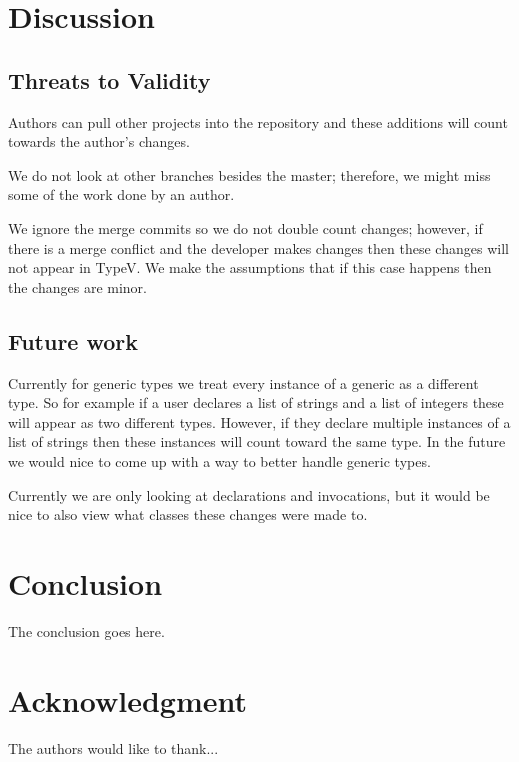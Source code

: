 \documentclass[conference]{IEEEtran}
\begin{document}
\section{Discussion}

\subsection{Threats to Validity}

Authors can pull other projects into the repository and these additions will count towards the author's changes. 

We do not look at other branches besides the master; therefore, we might miss some of the work done by an author.

We ignore the merge commits so we do not double count changes; however, if there is a merge conflict and the developer makes changes then these changes will not appear in TypeV. We make the assumptions that if this case happens then the changes are minor.

\subsection{Future work}

Currently for generic types we treat every instance of a generic as a different type. So for example if a user declares a list of strings and a list of integers these will appear as two different types. However, if they declare multiple instances of a list of strings then these instances will count toward the same type. In the future we would nice to come up with a way to better handle generic types.

Currently we are only looking at declarations and invocations, but it would be nice to also view what classes these changes were made to.

\section{Conclusion}
The conclusion goes here.






\section*{Acknowledgment}


The authors would like to thank...
\end{document}
